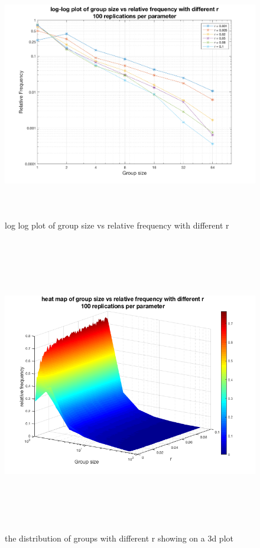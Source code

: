 \documentclass[12pt]{article}
\begin{document}
\begin{figure}[H] %
\centering
\includegraphics[width = 14 cm, height = 11cm]{logloggr100.png}
\caption{log log plot of group size vs relative frequency with different r}
\label{fig:loglog3}
\end{figure}

\begin{figure}[H] %
\centering
\includegraphics[width = 16 cm, height = 13cm]{hmq2.png}
\caption{the distribution of groups with different r showing on a 3d plot}
\label{fig:loglog4}
\end{figure}
\end{document}
